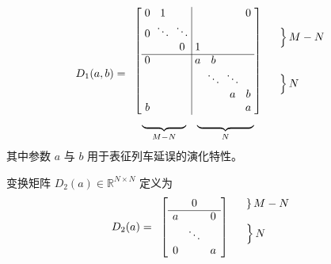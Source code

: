 \begin{equation*}
    D_{1}(a,b)=
    \begin{array}{ccccccccc}
        \setlength{\arraycolsep}{1mm}
        \left[
        \begin{array}{ccc|cccc}
            0&1& & & & & 0\\
            0&\ddots&\ddots & & & & \\
            & &0&1& & & \\ 
            \cline{1-7}
            0& & &a&b& & \\
            & & & &\ddots&\ddots& \\
            & & & & & a&b\\
            b& & & & & &a\\
        \end{array}
        \right]
        & 
        \begin{array}{c}
            \left.\rule{0mm}{3.5mm}\right\}M-N  \\ \hfill
            \\
            \\
            \left.\rule{0mm}{3.5mm}\right\}N \hfill
            \\
        \end{array} \\
        \begin{array}{cc}
            \underbrace{\rule{14mm}{0mm}}_{M-N} &  
            \underbrace{\rule{18mm}{0mm}}_{N}
        \end{array}
    \end{array}
\end{equation*}
其中参数 $a$ 与 $b$ 用于表征列车延误的演化特性。

变换矩阵 $D_{2}(a)\in \mathbb{R}^{N \times N}$ 定义为
\begin{equation*}
    D_{2}(a)=
    \begin{array}{cccccc}
        \setlength{\arraycolsep}{1.5mm}
        \left[
        \begin{array}{ccc}
            & 0&  \\
            \cline{1-3}
            a& &0\\ 
            &\ddots & \\
            0& &a\\
            
        \end{array}
        \right]
        &  
        \begin{array}{c}
            \left.\rule{0mm}{2mm}\right\}M-N \\ 
            \\
            \left.\rule{0mm}{4mm}\right\}N \hfill\\
            \\
        \end{array}
    \end{array}
\end{equation*}

